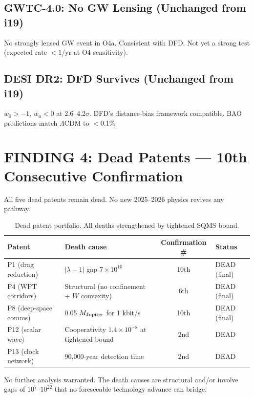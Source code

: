 \documentclass[11pt]{article}
\newcommand{\ee}[1]{\times 10^{#1}}
\begin{document}
\subsection{GWTC-4.0: No GW Lensing (Unchanged from i19)}

No strongly lensed GW event in O4a. Consistent with DFD. Not yet a strong
test (expected rate $< 1$/yr at O4 sensitivity).

\subsection{DESI DR2: DFD Survives (Unchanged from i19)}

$w_0 > -1$, $w_a < 0$ at 2.6--4.2$\sigma$. DFD's distance-bias framework
compatible. BAO predictions match $\Lambda$CDM to $<$0.1\%.


\section{FINDING 4: Dead Patents --- 10th Consecutive Confirmation}
\label{sec:dead}

All five dead patents remain dead. No new 2025--2026 physics revives any
pathway.

\begin{table}[h]
\centering
\begin{tabular}{llcl}
\toprule
\textbf{Patent} & \textbf{Death cause} & \textbf{Confirmation \#} & \textbf{Status} \\
\midrule
P1 (drag reduction) & $|\lambda-1|$ gap $7\ee{10}$ & 10th & DEAD (final) \\
P4 (WPT corridors) & Structural (no confinement + $W$ convexity) & 6th & DEAD (final) \\
P8 (deep-space comms) & 0.05 $M_{\rm Jupiter}$ for 1 kbit/s & 10th & DEAD (final) \\
P12 (scalar wave) & Cooperativity $1.4\ee{-8}$ at tightened bound & 2nd & DEAD \\
P13 (clock network) & 90,000-year detection time & 2nd & DEAD \\
\bottomrule
\end{tabular}
\caption{Dead patent portfolio. All deaths strengthened by tightened SQMS bound.}
\end{table}

No further analysis warranted. The death causes are structural and/or
involve gaps of $10^{7}$--$10^{22}$ that no foreseeable technology advance
can bridge.
\end{document}

